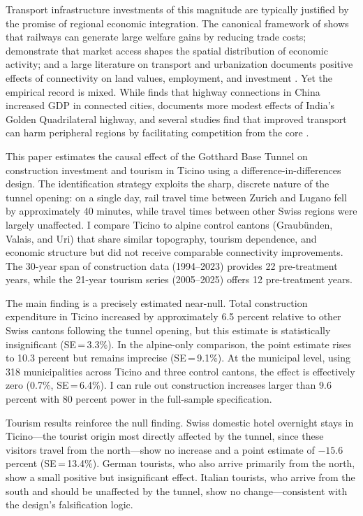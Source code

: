 \documentclass[12pt]{article}
\begin{document}
Transport infrastructure investments of this magnitude are typically justified by the promise of regional economic integration. The canonical framework of \citet{donaldson2018} shows that railways can generate large welfare gains by reducing trade costs; \citet{redding2004} demonstrate that market access shapes the spatial distribution of economic activity; and a large literature on transport and urbanization documents positive effects of connectivity on land values, employment, and investment \citep{baum-snow2007, duranton2012, gibbons2010}. Yet the empirical record is mixed. While \citet{faber2014} finds that highway connections in China increased GDP in connected cities, \citet{ghani2016} documents more modest effects of India's Golden Quadrilateral highway, and several studies find that improved transport can harm peripheral regions by facilitating competition from the core \citep{helpman1998, krugman1991}.

This paper estimates the causal effect of the Gotthard Base Tunnel on construction investment and tourism in Ticino using a difference-in-differences design. The identification strategy exploits the sharp, discrete nature of the tunnel opening: on a single day, rail travel time between Zurich and Lugano fell by approximately 40 minutes, while travel times between other Swiss regions were largely unaffected. I compare Ticino to alpine control cantons (Graub\"unden, Valais, and Uri) that share similar topography, tourism dependence, and economic structure but did not receive comparable connectivity improvements. The 30-year span of construction data (1994--2023) provides 22 pre-treatment years, while the 21-year tourism series (2005--2025) offers 12 pre-treatment years.

The main finding is a precisely estimated near-null. Total construction expenditure in Ticino increased by approximately 6.5 percent relative to other Swiss cantons following the tunnel opening, but this estimate is statistically insignificant (SE\,=\,3.3\%). In the alpine-only comparison, the point estimate rises to 10.3 percent but remains imprecise (SE\,=\,9.1\%). At the municipal level, using 318 municipalities across Ticino and three control cantons, the effect is effectively zero (0.7\%, SE\,=\,6.4\%). I can rule out construction increases larger than 9.6 percent with 80 percent power in the full-sample specification.

Tourism results reinforce the null finding. Swiss domestic hotel overnight stays in Ticino---the tourist origin most directly affected by the tunnel, since these visitors travel from the north---show no increase and a point estimate of $-15.6$ percent (SE\,=\,13.4\%). German tourists, who also arrive primarily from the north, show a small positive but insignificant effect. Italian tourists, who arrive from the south and should be unaffected by the tunnel, show no change---consistent with the design's falsification logic.
\end{document}
